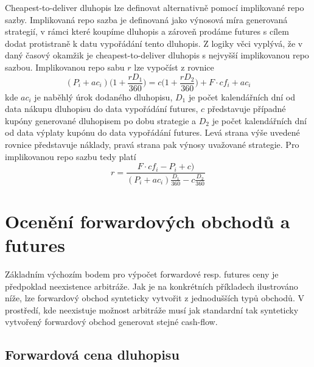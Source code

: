 \documentclass[a4paper]{book}
\begin{document}
Cheapest-to-deliver dluhopis lze definovat alternativně pomocí implikované repo sazby. Implikovaná repo sazba je definovaná jako výnosová míra generovaná strategií, v rámci které koupíme dluhopis a zároveň prodáme futures s cílem dodat protistraně k datu vypořádání tento dluhopis. Z logiky věci vyplývá, že v daný časový okamžik je cheapest-to-deliver dluhopis s nejvyšší implikovanou repo sazbou. Implikovanou repo sabu $r$ lze vypočíst z rovnice
\begin{equation*}
(P_i + ac_i)\Bigg(1 + \frac{r D_1}{360} \Bigg) = c \Bigg(1 + \frac{r D_2}{360} \Bigg) + F \cdot cf_i + ac_i
\end{equation*}
kde $ac_i$ je naběhlý úrok dodaného dluhopisu, $D_1$  je počet kalendářních dní od data nákupu dluhopisu do data vypořádání futures, $c$ představuje případné kupóny generované dluhopisem po dobu strategie a $D_2$ je počet kalendářních dní od data výplaty kupónu do data vypořádání futures. Levá strana výše uvedené rovnice představuje náklady, pravá strana pak výnosy uvažované strategie. Pro implikovanou repo sazbu tedy platí
\begin{equation}
r = \frac{F \cdot cf_i - P_i + c)}{(P_i + ac_i)\frac{D_1}{360} - c \frac{D_2}{360}}
\end{equation}

\section{Ocenění forwardových obchodů a futures}

Základním výchozím bodem pro výpočet forwardové resp. futures ceny je předpoklad neexistence arbitráže. Jak je na konkrétních příkladech ilustrováno níže, lze forwardový obchod synteticky vytvořit z jednodušších typů obchodů. V prostředí, kde neexistuje možnost arbitráže musí jak standardní tak synteticky vytvořený forwardový obchod generovat stejné cash-flow.

\subsection{Forwardová cena dluhopisu}
\end{document}
